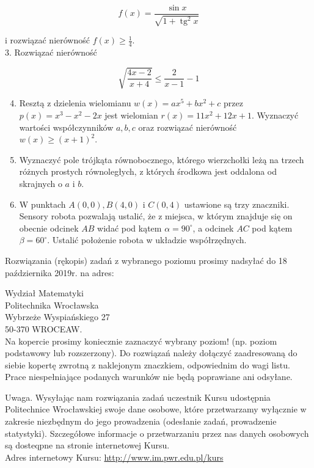 \documentclass[10pt]{article}
\begin{document}
$$
f(x)=\frac{\sin x}{\sqrt{1+\operatorname{tg}^{2} x}}
$$

i rozwiązać nierówność $f(x) \geqslant \frac{1}{4}$.\\
3. Rozwiązać nierówność

$$
\sqrt{\frac{4 x-2}{x+4}} \leqslant \frac{2}{x-1}-1
$$

\begin{enumerate}
  \setcounter{enumi}{3}
  \item Resztą z dzielenia wielomianu $w(x)=a x^{5}+b x^{2}+c$ przez $p(x)=x^{3}-x^{2}-2 x$ jest wielomian $r(x)=11 x^{2}+12 x+1$. Wyznaczyć wartości współczynników $a, b, c$ oraz rozwiązać nierówność $w(x) \geqslant(x+1)^{2}$.
  \item Wyznaczyć pole trójkąta równobocznego, którego wierzchołki leżą na trzech różnych prostych równoległych, z których środkowa jest oddalona od skrajnych o $a$ i $b$.
  \item W punktach $A(0,0), B(4,0)$ i $C(0,4)$ ustawione są trzy znaczniki. Sensory robota pozwalają ustalić, że z miejsca, w którym znajduje się on obecnie odcinek $A B$ widać pod kątem $\alpha=90^{\circ}$, a odcinek $A C$ pod kątem $\beta=60^{\circ}$. Ustalić położenie robota w układzie współrzędnych.
\end{enumerate}

Rozwiązania (rękopis) zadań z wybranego poziomu prosimy nadsyłać do 18 października 2019r. na adres:

Wydział Matematyki\\
Politechnika Wrocławska\\
Wybrzeże Wyspiańskiego 27\\
50-370 WROCEAW.\\
Na kopercie prosimy koniecznie zaznaczyć wybrany poziom! (np. poziom podstawowy lub rozszerzony). Do rozwiązań należy dołączyć zaadresowaną do siebie kopertę zwrotną z naklejonym znaczkiem, odpowiednim do wagi listu. Prace niespełniające podanych warunków nie będą poprawiane ani odsyłane.

Uwaga. Wysyłając nam rozwiązania zadań uczestnik Kursu udostępnia Politechnice Wrocławskiej swoje dane osobowe, które przetwarzamy wyłącznie w zakresie niezbędnym do jego prowadzenia (odesłanie zadań, prowadzenie statystyki). Szczegółowe informacje o przetwarzaniu przez nas danych osobowych są dosteqpne na stronie internetowej Kursu.\\
Adres internetowy Kursu: \href{http://www.im.pwr.edu.pl/kurs}{http://www.im.pwr.edu.pl/kurs}
\end{document}
